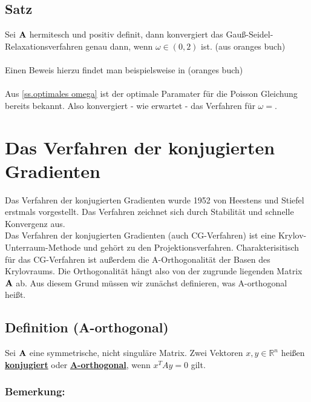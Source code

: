\subsection{Satz}\label{ss.konvergenz für omega}

Sei ${\textbf{A}}$ hermitesch und positiv definit, dann konvergiert das Gauß-Seidel-Relaxationsverfahren genau dann, wenn $\omega \in (0,2)$ ist. (aus oranges buch) \\ \\

Einen Beweis hierzu findet man beispielsweise in (oranges buch) \\ \\

Aus \autoref{ss.optimales omega} ist der optimale Paramater für die Poisson Gleichung bereits bekannt. Also konvergiert - wie erwartet - das Verfahren für $\omega = $.

\section{Das Verfahren der konjugierten Gradienten}\label{s.Das Verfahren der konjugierten Gradienten}

Das Verfahren der konjugierten Gradienten wurde 1952 von Heestens und Stiefel erstmals vorgestellt. Das Verfahren zeichnet sich durch Stabilität und schnelle Konvergenz aus. \\
Das Verfahren der konjugierten Gradienten (auch CG-Verfahren) ist eine Krylov-Unterraum-Methode und gehört zu den Projektionsverfahren. Charakterisitisch für das CG-Verfahren ist außerdem die A-Orthogonalität der Basen des Krylovraums. Die Orthogonalität hängt also von der zugrunde liegenden Matrix ${\textbf{A}}$ ab. Aus diesem Grund müssen wir zunächst definieren, was A-orthogonal heißt.

\subsection{Definition (A-orthogonal)}\label{ss.A-orthogonal}
Sei ${\textbf{A}}$ eine symmetrische, nicht singuläre Matrix. Zwei Vektoren $x,y \in \mathbb{R}^{n}$ heißen \underline{\textbf{konjugiert}} oder \underline{\textbf{A-orthogonal}}, wenn $x^{T}Ay = 0$ gilt.

\subsubsection{Bemerkung:}\label{sss.Bemerkung zu A-orthogonal}


